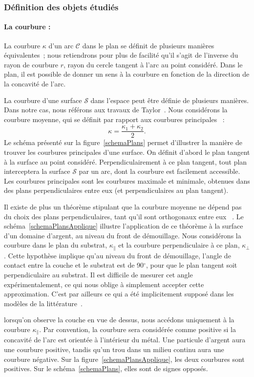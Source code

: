 			\subsubsection{Définition des objets étudiés}
\paragraph*{La courbure :} La courbure $\kappa$ d’un arc $\mathcal{C}$ dans le plan se définit de plusieurs manières équivalentes~; nous retiendrons pour plus de facilité qu’il s’agit de l’inverse du rayon de courbure $r$, rayon du cercle tangent à l’arc au point considéré. Dans le plan, il est possible de donner un sens à la courbure en fonction de la direction de la concavité de l’arc.\par 
La courbure d’une surface $\mathcal{S}$ dans l’espace peut être définie de plusieurs manières. Dans notre cas, nous référons aux travaux de Taylor~\cite{taylor1992ii}. Nous considérons la courbure moyenne, qui se définit par rapport aux \og courbures principales \fg~:
\begin{equation}
\kappa = \dfrac{\kappa_1+\kappa_2}{2}.
\label{eCourb}
\end{equation}
Le schéma présenté sur la figure~\ref{schemaPlans} permet d’illustrer la manière de trouver les courbures principales d’une surface. On définit d’abord le plan tangent à la surface au point considéré. Perpendiculairement à ce plan tangent, tout plan interceptera la surface $\mathcal{S}$ par un arc, dont la courbure est facilement accessible. Les courbures principales sont les courbures maximale et minimale, obtenues dans des plans perpendiculaires entre eux (et perpendiculaires au plan tangent).\par
Il existe de plus un théorème stipulant que la courbure moyenne ne dépend pas du choix des plans perpendiculaires, tant qu’il sont orthogonaux entre eux ~\cite{taylor1992ii}. Le schéma~\ref{schemaPlansApplique} illustre l’application de ce théorème à la surface d'un domaine d’argent, au niveau du front de démouillage. Nous considérons la courbure dans le plan du substrat, $\kappa_\parallel$ et la courbure perpendiculaire à ce plan, $\kappa_\perp$. Cette hypothèse implique qu’au niveau du front de démouillage, l’angle de contact entre la couche et le substrat est de 90$^\circ$, pour que le plan tangent soit perpendiculaire au substrat. Il est difficile de mesurer cet angle expérimentalement, ce qui nous oblige à simplement accepter cette approximation. C’est par ailleurs ce qui a été implicitement supposé dans les modèles de la littérature~\cite{brandon1966mobility, jiran1990capillary}.\par 
lorsqu’on observe la couche en vue de dessus, nous accédons uniquement à la courbure $\kappa_\parallel$. Par convention, la courbure sera considérée comme positive si la concavité de l’arc est orientée à l’intérieur du métal. Une particule d’argent aura une courbure positive, tandis qu’un trou dans un milieu continu aura une courbure négative. Sur la figure~\ref{schemaPlansApplique}, les deux courbures sont positives. Sur le schéma~\ref{schemaPlans}, elles sont de signes opposés.\par 

